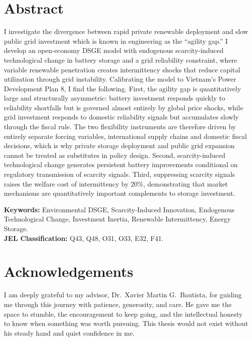 \documentclass{fulbrightthesis}
\begin{document}
\begin{romanpages}

\tableofcontents

\clearpage
\section*{Abstract}
I investigate the divergence between rapid private renewable deployment and slow public grid investment which is known in engineering as the ``agility gap.'' I develop an open-economy DSGE model with endogenous scarcity-induced technological change in battery storage and a grid reliability constraint, where variable renewable penetration creates intermittency shocks that reduce capital utilization through grid instability. Calibrating the model to Vietnam's Power Development Plan 8, I find the following. First, the agility gap is quantitatively large and structurally asymmetric: battery investment responds quickly to reliability shortfalls but is governed almost entirely by global price shocks, while grid investment responds to domestic reliability signals but accumulates slowly through the fiscal rule. The two flexibility instruments are therefore driven by entirely separate forcing variables, international supply chains and domestic fiscal decisions, which is why private storage deployment and public grid expansion cannot be treated as substitutes in policy design. Second, scarcity-induced technological change generates persistent battery improvements conditional on regulatory transmission of scarcity signals. Third, suppressing scarcity signals raises the welfare cost of intermittency by 20\%, demonstrating that market mechanisms are quantitatively important complements to storage investment.

\vspace{0.5cm}
\noindent \textbf{Keywords:} Environmental DSGE, Scarcity-Induced Innovation, Endogenous Technological Change, Investment Inertia, Renewable Intermittency, Energy Storage.\\
\noindent \textbf{JEL Classification:} Q43, Q48, O31, O33, E32, F41.

\clearpage
\section*{Acknowledgements}
I am deeply grateful to my advisor, Dr.\ Xavier Martin G.\ Bautista, for guiding me through this journey with patience, generosity, and care. He gave me the space to stumble, the encouragement to keep going, and the intellectual honesty to know when something was worth pursuing. This thesis would not exist without his steady hand and quiet confidence in me.


\end{romanpages}
\end{document}
